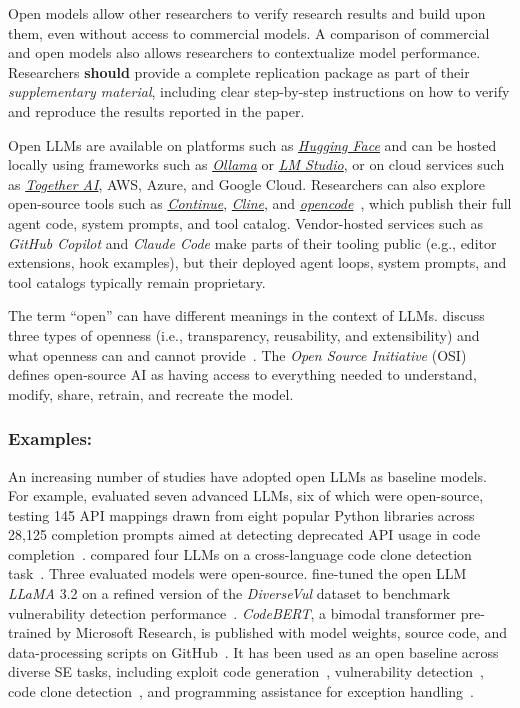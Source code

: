\documentclass[smallextended]{svjour3}
\newcommand{\should}{\textbf{should}\xspace}
\newcommand{\supplementarymaterial}{\emph{supplementary material}\xspace}
\newcommand{\supplementarymaterial}{\emph{supplementary material}\xspace}
\newcommand{\guidelinesubsubsection}[1]{\subsubsection{\bfseries #1:}}
\newcommand{\guidelinesubsubsection}[1]{\subsubsection{#1}}
\begin{document}
Open models allow other researchers to verify research results and build upon them, even without access to commercial models.
A comparison of commercial and open models also allows researchers to contextualize model performance.
Researchers \should provide a complete replication package as part of their \supplementarymaterial, including clear step-by-step instructions on how to verify and reproduce the results reported in the paper.

Open LLMs are available on platforms such as \href{https://huggingface.co/}{\emph{Hugging Face}} and can be hosted locally using frameworks such as \href{https://ollama.com/}{\emph{Ollama}} or \href{https://lmstudio.ai/}{\emph{LM Studio}}, or on cloud services such as \href{https://together.ai/}{\emph{Together AI}}, AWS, Azure, and Google Cloud.
Researchers can also explore open-source tools such as \href{https://www.continue.dev/}{\emph{Continue}}, \href{https://cline.bot/}{\emph{Cline}}, and \href{https://opencode.ai/}{\emph{opencode}}~\cite{opencode}, which publish their full agent code, system prompts, and tool catalog. Vendor-hosted services such as \emph{GitHub Copilot} and \emph{Claude Code} make parts of their tooling public (e.g., editor extensions, hook examples), but their deployed agent loops, system prompts, and tool catalogs typically remain proprietary.

The term ``open'' can have different meanings in the context of LLMs.
\citeauthor{widder2024open} discuss three types of openness (i.e., transparency, reusability, and extensibility) and what openness can and cannot provide~\cite{widder2024open}.
The \emph{Open Source Initiative} (OSI)~\cite{OSIAI2024} defines open-source AI as having access to everything needed to understand, modify, share, retrain, and recreate the model.

\guidelinesubsubsection{Examples}

An increasing number of studies have adopted open LLMs as baseline models.
For example, \citeauthor{DBLP:journals/corr/abs-2406-09834} evaluated seven advanced LLMs, six of which were open-source, testing 145 API mappings drawn from eight popular Python libraries across 28,125 completion prompts aimed at detecting deprecated API usage in code completion~\cite{DBLP:journals/corr/abs-2406-09834}.
\citeauthor{DBLP:journals/corr/abs-2408-04430} compared four LLMs on a cross-language code clone detection task~\cite{DBLP:journals/corr/abs-2408-04430}.
Three evaluated models were open-source.
\citeauthor{DBLP:conf/eicc/GoncalvesSC0MPS25} fine-tuned the open LLM \emph{LLaMA} 3.2 on a refined version of the \emph{DiverseVul} dataset to benchmark vulnerability detection performance~\cite{DBLP:conf/eicc/GoncalvesSC0MPS25}.
\emph{CodeBERT}, a bimodal transformer pre-trained by Microsoft Research, is published with model weights, source code, and data-processing scripts on GitHub~\cite{codebert}. It has been used as an open baseline across diverse SE tasks, including exploit code generation~\cite{DBLP:journals/jss/YangZCZHC23}, vulnerability detection~\cite{DBLP:conf/gaiis/XiaSD24}, code clone detection~\cite{DBLP:conf/kbse/SonnekalbGBM22}, and programming assistance for exception handling~\cite{DBLP:conf/icse/CaiYMMN24}.
\end{document}

